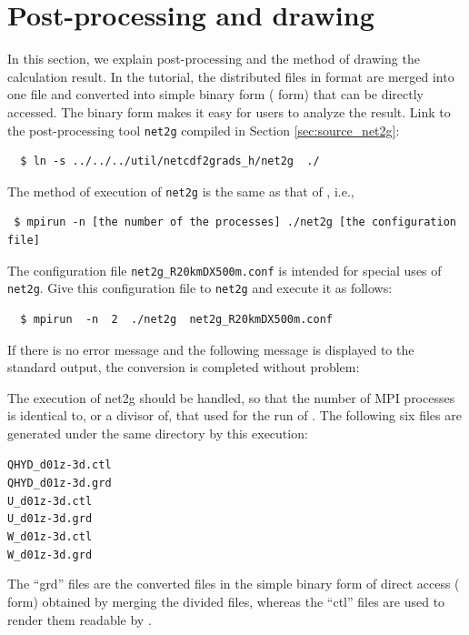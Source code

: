 \section{Post-processing and drawing} \label{sec:ideal_exp_net2g}
In this section, we explain post-processing and the method of drawing the calculation result.  In the tutorial, the distributed files in \netcdf format are merged into one file and converted into simple binary form ({\grads} form) that can be directly accessed. The binary form makes it easy for users to analyze the result. Link to the post-processing tool \verb|net2g| compiled  in Section \ref{sec:source_net2g}:
\begin{verbatim}
  $ ln -s ../../../util/netcdf2grads_h/net2g  ./
\end{verbatim}

The method of execution of \verb|net2g| is the same as that of \scalerm, i.e.,
\begin{verbatim}
 $ mpirun -n [the number of the processes] ./net2g [the configuration file]
\end{verbatim}
The configuration file \verb|net2g_R20kmDX500m.conf| is intended for special uses of \verb|net2g|.
Give this configuration file to \verb|net2g| and execute it as follows:
\begin{verbatim}
  $ mpirun  -n  2  ./net2g  net2g_R20kmDX500m.conf
\end{verbatim}
If there is no error message and the following message is displayed to the standard output,
the conversion is completed without problem:

The execution of net2g should be handled,
so that the number of MPI processes is identical to, or a divisor of, that used for the run of \scalerm. The following six files are generated under the same directory by this execution:
\begin{alltt}
  QHYD_d01z-3d.ctl
  QHYD_d01z-3d.grd
  U_d01z-3d.ctl
  U_d01z-3d.grd
  W_d01z-3d.ctl
  W_d01z-3d.grd
\end{alltt}
The ``grd'' files are the converted files in the simple binary form of direct access
({\grads} form) obtained by merging the divided files,
whereas the ``ctl'' files are used to render them readable by \grads.

